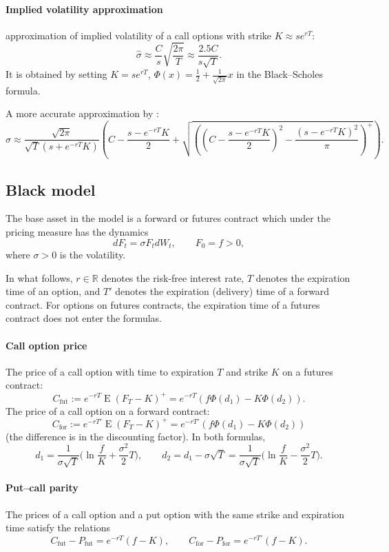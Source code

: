 \documentclass[a4paper,11pt,titlepage]{article}
\newcommand{\R}{\mathbb{R}}
\DeclareMathOperator{\E}{E}
\renewcommand{\hat}{\widehat}
\theoremstyle{remark}
\begin{document}
\paragraph{Implied volatility approximation}
\cite{Brenner88} approximation of implied volatility of a call options with strike $K\approx se^{rT}$:
\[
\hat\sigma \approx \frac{C}{s} \sqrt{\frac{2\pi}{T}}
  \approx \frac{2.5C}{s\sqrt T}.
\]
It is obtained by setting $K = se^{rT}$, $\Phi(x) = \frac12 + \frac{1}{\sqrt{2\pi}} x$ in the Black--Scholes formula.

A more accurate approximation by \cite{CorradoMiller96}:
{\small
\[
\hat\sigma 
  \approx \frac{\sqrt{2\pi}}{\sqrt T (s + e^{-rT}K)} 
    \left( 
      C - \frac{s-e^{-rT}K}{2} 
      + \sqrt{
          \left( \left( C - \frac{s-e^{-rT}K}{2} \right)^2 
          - \frac{(s-e^{-rT}K)^2}{\pi} \right)^+ 
        } 
    \right).
\]
}

\subsection{Black model}
The base asset in the model is a forward or futures contract which under the pricing measure has the dynamics
\[
dF_t = \sigma F_t dW_t, \qquad F_0=f>0,
\]
where $\sigma>0$ is the volatility.

In what follows, $r\in \R$ denotes the risk-free interest rate, $T$ denotes the expiration time of an option, and $T'$ denotes the expiration (delivery) time of a forward contract.
For options on futures contracts, the expiration time of a futures contract does not enter the formulas.

\paragraph{Call option price \citep{Black76}} 
The price of a call option with time to expiration $T$ and strike $K$ on a futures contract:
\[
C_\mathrm{fut} := e^{-rT} \E(F_T - K)^+ = e^{-rT}(f\Phi(d_1) - K\Phi(d_2)).
\]
The price of a call option on a forward contract:
\[
C_\mathrm{for} := e^{-rT'} \E(F_T - K)^+ = e^{-rT'}(f\Phi(d_1) - K\Phi(d_2))
\]
(the difference is in the discounting factor).
In both formulas,
\[
d_1 = \frac{1}{\sigma\sqrt T} 
  \biggl( 
    \ln\frac{f}{K} + \frac{\sigma^2}{2} T
  \biggr),\qquad 
d_2 = d_1 - \sigma\sqrt T 
  = \frac{1}{\sigma\sqrt T} \biggl(\ln\frac{f}{K} 
    -\frac{\sigma^2}{2} T\biggr).
\]

\paragraph{Put--call parity}
The prices of a call option and a put option with the same strike and expiration time satisfy the relations
\[
C_\mathrm{fut} - P_\mathrm{fut} = e^{-rT}(f - K), \qquad
C_\mathrm{for} - P_\mathrm{for} = e^{-rT'}(f - K).
\]
\end{document}
